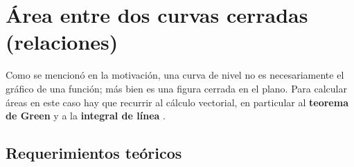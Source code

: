 \documentclass[12pt]{article}
\begin{document}
\section*{Área entre dos curvas cerradas (relaciones)}

Como se mencionó en la motivación, una curva de nivel no es necesariamente el gráfico de una función; más bien es una figura cerrada en el plano. Para calcular áreas en este caso hay que recurrir al cálculo vectorial, en particular al \textbf{teorema de Green} y a la \textbf{integral de línea} \cite{stewart12}.

\subsection*{Requerimientos teóricos}
\end{document}
